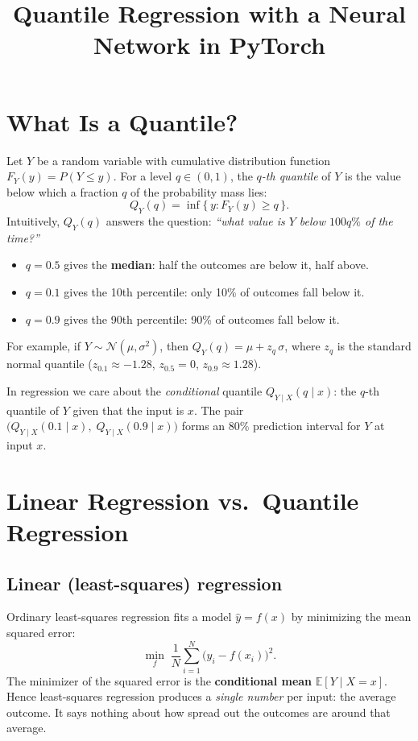 \documentclass[11pt]{article}
\title{Quantile Regression with a Neural Network in PyTorch}
\author{}
\date{}
\begin{document}
\maketitle

\section{What Is a Quantile?}

Let $Y$ be a random variable with cumulative distribution function
$F_Y(y) = P(Y \le y)$. For a level $q \in (0,1)$, the \emph{$q$-th quantile}
of $Y$ is the value below which a fraction $q$ of the probability mass lies:
\[
  Q_Y(q) = \inf\{\, y : F_Y(y) \ge q \,\}.
\]
Intuitively, $Q_Y(q)$ answers the question: \emph{``what value is $Y$ below
  $100q\%$ of the time?''}

\begin{itemize}
  \item $q = 0.5$ gives the \textbf{median}: half the outcomes are below it, half above.
  \item $q = 0.1$ gives the 10th percentile: only 10\% of outcomes fall below it.
  \item $q = 0.9$ gives the 90th percentile: 90\% of outcomes fall below it.
\end{itemize}

For example, if $Y \sim \mathcal{N}(\mu, \sigma^2)$, then
$Q_Y(q) = \mu + z_q\,\sigma$, where $z_q$ is the standard normal quantile
($z_{0.1} \approx -1.28$, $z_{0.5} = 0$, $z_{0.9} \approx 1.28$).

In regression we care about the \emph{conditional} quantile
$Q_{Y \mid X}(q \mid x)$: the $q$-th quantile of $Y$ given that the input is $x$.
The pair $\big(Q_{Y\mid X}(0.1\mid x),\; Q_{Y\mid X}(0.9\mid x)\big)$ forms an
80\% prediction interval for $Y$ at input $x$.

\section{Linear Regression vs.\ Quantile Regression}

\subsection{Linear (least-squares) regression}

Ordinary least-squares regression fits a model $\hat y = f(x)$ by minimizing
the mean squared error:
\[
  \min_f \; \frac{1}{N}\sum_{i=1}^{N} \big(y_i - f(x_i)\big)^2 .
\]
The minimizer of the squared error is the \textbf{conditional mean}
$\mathbb{E}[Y \mid X = x]$. Hence least-squares regression produces a
\emph{single number} per input: the average outcome. It says nothing about how
spread out the outcomes are around that average.
\end{document}

